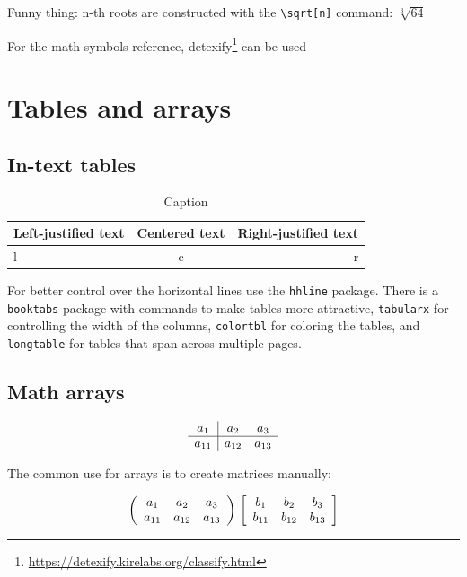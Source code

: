 \documentclass[a4paper]{article}
\newcommand{\sign}[1]{\texttt{\textbackslash{#1}}}
\begin{document}
Funny thing: n-th roots are constructed with the \sign{sqrt[n]\string{\string}} command: $\sqrt[3]{64}$ 

For the math symbols reference, detexify\footnote{\href{https://detexify.kirelabs.org/classify.html}{https://detexify.kirelabs.org/classify.html}} can be used

\section{Tables and arrays}

\subsection{In-text tables}

\begin{table}[h]
    \centering
    \begin{tabular}{|l|c||r|}
        \hline
        Left-justified text & Centered text & Right-justified text  \\
        \hline
        l & c & r \\
        \hline
    \end{tabular}
    \caption{Caption}
    \label{tab:my_label}
\end{table}

For better control over the horizontal lines use the \texttt{hhline} package.
There is a \texttt{booktabs} package with commands to make tables more attractive, \texttt{tabularx} for controlling the width of the columns, \texttt{colortbl} for coloring the tables, and \texttt{longtable} for tables that span across multiple pages.

\subsection{Math arrays}

$$
\begin{array}{c|c c}
    a_1 & a_2 & a_3  \\
    \hline
    a_{11} & a_{12} & a_{13}  
\end{array}
$$

The common use for arrays is to create matrices manually:

$$
\left(
\begin{array}{ccc}
    a_1 & a_2 & a_3  \\
    a_{11} & a_{12} & a_{13}  
\end{array}\right)
\\
\left[
\begin{array}{ccc}
    b_1 & b_2 & b_3  \\
    b_{11} & b_{12} & b_{13}  
\end{array}\right]
$$
\end{document}
